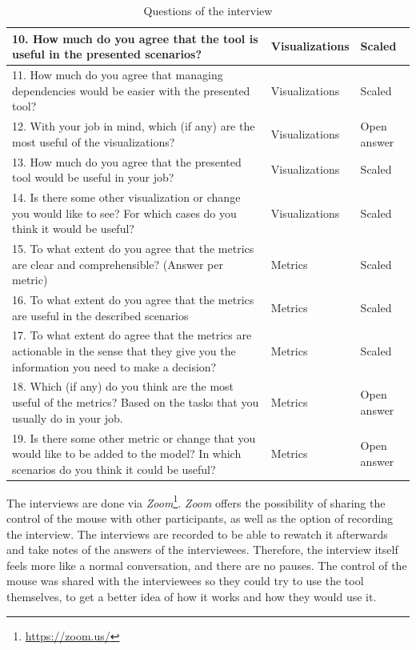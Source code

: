 \begin{table}[p]
\begin{center}
\begin{tabularx}{\textwidth}{|X|l|l|}
    \hline
    10.	How much do you agree that the tool is useful in the presented scenarios? & Visualizations & Scaled \\\hline
    11.	How much do you agree that managing dependencies would be easier with the presented tool? & Visualizations & Scaled \\\hline
    12.	With your job in mind, which (if any) are the most useful of the visualizations? & Visualizations & Open answer \\\hline
    13.	How much do you agree that the presented tool would be useful in your job? & Visualizations & Scaled \\\hline
    14.	Is there some other visualization or change you would like to see? For which cases do you think it would be useful? & Visualizations & Scaled \\\hline
    \hline
    15.	To what extent do you agree that the metrics are clear and comprehensible? (Answer per metric) & Metrics & Scaled \\\hline
    16.	To what extent do you agree that the metrics are useful in the described scenarios & Metrics & Scaled \\\hline
    17.	To what extent do agree that the metrics are actionable in the sense that they give you the information you need to make a decision? & Metrics & Scaled \\\hline
    18.	Which (if any) do you think are the most useful of the metrics? Based on the tasks that you usually do in your job. & Metrics & Open answer \\\hline
    19.	Is there some other metric or change that you would like to be added to the model? In which scenarios do you think it could be useful? & Metrics & Open answer \\\hline
    \end{tabularx}
    \end{center}
    \caption{Questions of the interview}
    \label{table:interview-questions}
\end{table}

The interviews are done via \textit{Zoom}\footnote{\url{https://zoom.us/}}. \textit{Zoom} offers the possibility of sharing the control of the mouse with other participants, as well as the option of recording the interview. The interviews are recorded to be able to rewatch it afterwards and take notes of the answers of the interviewees. Therefore, the interview itself feels more like a normal conversation, and there are no pauses. The control of the mouse was shared with the interviewees so they could try to use the tool themselves, to get a better idea of how it works and how they would use it.

